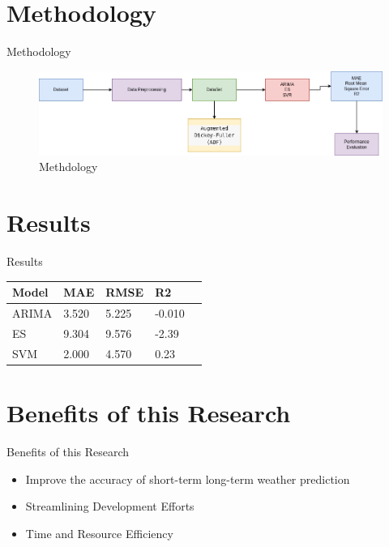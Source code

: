 \documentclass{beamer}
\begin{document}
\section{Methodology}

\begin{frame}{Methodology}
 \begin{figure}
    \includegraphics[width=\textwidth]{ai_class_project_methodolog.png}
    \caption{Methdology}
  \end{figure}
\end{frame}


\section{Results}

\begin{frame}{Results}
\begin{table}[h]
\centering
\small
\label{tab:my_table}
\begin{tabular}{|p{1.5cm}|p{1.5cm}|p{1.5cm}|p{1.5cm}|p{1.5cm}|}
\hline
Model & MAE & RMSE & R2 \\
\hline
ARIMA & 3.520 & 5.225 & -0.010 \\
ES & 9.304 & 9.576 & -2.39 \\
SVM & 2.000 & 4.570 & 0.23 \\
\hline
\end{tabular}
\end{table}
\end{frame}

\section{Benefits of this Research}

\begin{frame}{Benefits of this Research}
\begin{itemize}
\item Improve the accuracy of short-term long-term weather prediction
\item Streamlining Development Efforts
\item Time and Resource Efficiency
\end{itemize}
\end{frame}
\end{document}
